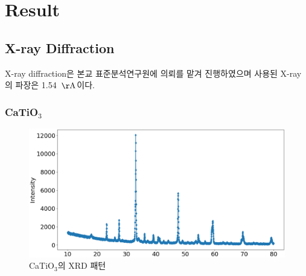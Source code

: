 \documentclass[aps,reprint,superscriptaddress,10pt]{revtex4-2}
\begin{document}
\section{Result}
\subsection{X-ray Diffraction}
X-ray diffraction은 본교 표준분석연구원에 의뢰를 맡겨 진행하였으며
사용된 X-ray의 파장은 1.54~$\mathrm{\AA}$이다.
\vspace{-1.2cm}
\subsubsection{CaTiO$_3$}
\begin{figure}[h!tb]
  \centering
  \includegraphics[scale=0.16]{Ca.png}
  \caption{CaTiO$_3$의 XRD 패턴}
  \label{fig:Ca}
\end{figure}
\vspace{-1.2cm}
\end{document}
